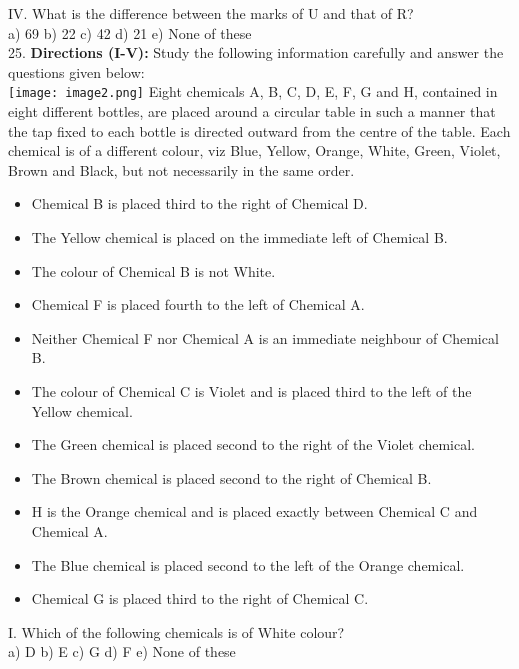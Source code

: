 \documentclass[
]{article}
\begin{document}
IV. What is the difference between the marks of U and that of R?\\
a) 69 \hspace{2mm}b) 22 \hspace{2mm}c) 42 \hspace{2mm}d) 21 \hspace{2mm}e) None of these\\

25. \textbf{Directions (I-V):} Study the following information carefully and answer the questions given
below:\\
\texttt{[image: image2.png]}
Eight chemicals A, B, C, D, E, F, G and H, contained in eight different bottles, are placed
around a circular table in such a manner that the tap fixed to each bottle is directed outward
from the centre of the table. Each chemical is of a different colour, viz Blue, Yellow, Orange,
White, Green, Violet, Brown and Black, but not necessarily in the same order.\\
\begin{itemize}

\item Chemical B is placed third to the right of Chemical D.
\item The Yellow chemical is placed on the immediate left of Chemical B.
\item The colour of Chemical B is not White.
\item Chemical F is placed fourth to the left of Chemical A.
\item Neither Chemical F nor Chemical A is an immediate neighbour of Chemical B.
\item The colour of Chemical C is Violet and is placed third to the left of the Yellow chemical.
\item The Green chemical is placed second to the right of the Violet chemical.
\item The Brown chemical is placed second to the right of Chemical B.
\item H is the Orange chemical and is placed exactly between Chemical C and Chemical A.
\item The Blue chemical is placed second to the left of the Orange chemical.
\item Chemical G is placed third to the right of Chemical C.
\end{itemize}

I. Which of the following chemicals is of White colour?\\
a) D \hspace{2mm}b) E \hspace{2mm}c) G \hspace{2mm}d) F \hspace{2mm}e) None of these\\
\end{document}
